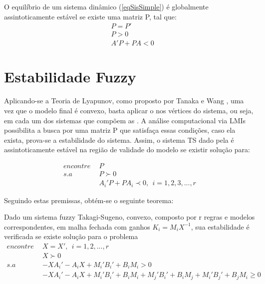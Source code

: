 \begin{myteo} \label{teoremaLyapP}
	O equilíbrio de um sistema dinâmico (\ref{eqSisSimple}) é globalmente assintoticamente estável se existe uma matriz P, tal que:
	\begin{align*}
		&P=P'  \\
		&P > 0 \\
		&A'P + P A < 0
	\end{align*}
\end{myteo}

\section{Estabilidade Fuzzy}
Aplicando-se a Teoria de Lyapunov, como proposto por Tanaka e Wang \cite{wang}, uma vez que o modelo final é convexo, basta aplicar o  nos vértices do sistema, ou seja, em cada um dos sistemas que compõem as . 
A análise computacional via LMIs possibilita a busca por uma matriz P que satisfaça essas condições, caso ela exista, prova-se a estabilidade do sistema. Assim, o sistema TS dado pela  é assintoticamente estável na região de validade do modelo \cite{tanakaWang} se existir solução para:

\begin{align} \label{eqLyapXk}
	encontre \ \ &P \nonumber \\
	s.a \ \ &P \succ 0 \nonumber \\
	&A_i'P + P A_i \prec 0, \ \ i=1,2,3, ... , r
\end{align}

Seguindo estas premissas, obtém-se o seguinte teorema:
\begin{myteo} \label{teoControlador}
Dado um sistema fuzzy Takagi-Sugeno, convexo, composto por r regras e modelos correspondentes, em malha fechada com ganhos $K_i = M_i X^{-1}$, sua estabilidade é verificada \cite{wang} se existe solução para o problema
	\begin{align} \label{eqContFuzzy}
		encontre \ \ &X = X', \ \ i = 1,2,...,r \nonumber \\
		&X \succ 0 \nonumber \\
		s.a \ \ &-XA_i'-A_iX + M_i'B_i' + B_iM_i > 0 \nonumber \\
		&-XA_i'-A_iX + M_i'B_i' + B_iM_i + M_j'B_i' + B_iM_j + M_i'B_j' + B_jM_i \geq 0
	\end{align}
\end{myteo}

%

